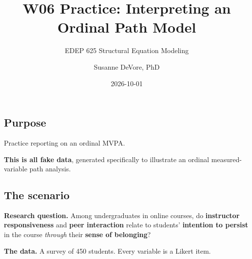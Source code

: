 \documentclass[
  letterpaper,
  DIV=11,
  numbers=noendperiod]{scrartcl}
\title{W06 Practice: Interpreting an Ordinal Path Model}
\subtitle{EDEP 625 Structural Equation Modeling}
\author{Susanne DeVore, PhD}
\date{2026-10-01}
\begin{document}
\maketitle


\subsection{Purpose}\label{purpose}

Practice reporting on an ordinal MVPA.

\begin{tcolorbox}[enhanced jigsaw, arc=.35mm, bottomrule=.15mm, breakable, colback=white, colframe=quarto-callout-note-color-frame, left=2mm, leftrule=.75mm, opacityback=0, rightrule=.15mm, toprule=.15mm]
\begin{minipage}[t]{5.5mm}
\textcolor{quarto-callout-note-color}{\faInfo}
\end{minipage}%
\begin{minipage}[t]{\textwidth - 5.5mm}

\textbf{This is all fake data}, generated specifically to illustrate an
ordinal measured-variable path analysis.

\end{minipage}%
\end{tcolorbox}

\subsection{The scenario}\label{the-scenario}

\textbf{Research question.} Among undergraduates in online courses, do
\textbf{instructor responsiveness} and \textbf{peer interaction} relate
to students' \textbf{intention to persist} in the course \emph{through}
their \textbf{sense of belonging}?

\textbf{The data.} A survey of 450 students. Every variable is a Likert
item.
\end{document}
